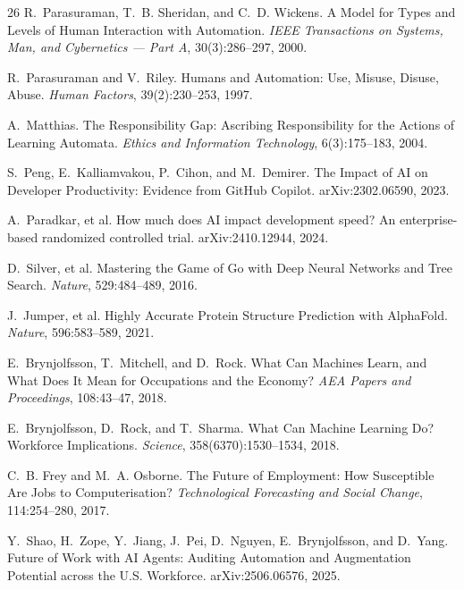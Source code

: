 \documentclass[11pt]{article}
\begin{document}
\begin{thebibliography}{26}
 R.~Parasuraman, T.~B. Sheridan, and C.~D.
Wickens. A Model for Types and Levels of Human Interaction with Automation.
\emph{IEEE Transactions on Systems, Man, and Cybernetics --- Part A},
30(3):286--297, 2000.

 R.~Parasuraman and V.~Riley. Humans and
Automation: Use, Misuse, Disuse, Abuse. \emph{Human Factors},
39(2):230--253, 1997.

 A.~Matthias. The Responsibility Gap: Ascribing
Responsibility for the Actions of Learning Automata. \emph{Ethics and
Information Technology}, 6(3):175--183, 2004.

 S.~Peng, E.~Kalliamvakou, P.~Cihon, and M.~Demirer. The
Impact of AI on Developer Productivity: Evidence from GitHub Copilot.
arXiv:2302.06590, 2023.

 A.~Paradkar, et al. How much does AI impact
development speed? An enterprise-based randomized controlled trial.
arXiv:2410.12944, 2024.

 D.~Silver, et al. Mastering the Game of Go with Deep
Neural Networks and Tree Search. \emph{Nature}, 529:484--489, 2016.

 J.~Jumper, et al. Highly Accurate Protein Structure
Prediction with AlphaFold. \emph{Nature}, 596:583--589, 2021.

 E.~Brynjolfsson, T.~Mitchell, and D.~Rock. What Can
Machines Learn, and What Does It Mean for Occupations and the Economy?
\emph{AEA Papers and Proceedings}, 108:43--47, 2018.

 E.~Brynjolfsson, D.~Rock, and T.~Sharma. What Can
Machine Learning Do? Workforce Implications. \emph{Science},
358(6370):1530--1534, 2018.

 C.~B. Frey and M.~A. Osborne. The Future of
Employment: How Susceptible Are Jobs to Computerisation?
\emph{Technological Forecasting and Social Change}, 114:254--280, 2017.

 Y.~Shao, H.~Zope, Y.~Jiang, J.~Pei, D.~Nguyen,
E.~Brynjolfsson, and D.~Yang. Future of Work with AI Agents: Auditing
Automation and Augmentation Potential across the U.S. Workforce.
arXiv:2506.06576, 2025.

\end{thebibliography}
\end{document}
